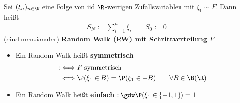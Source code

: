 \begin{defi}\enter %
Sei $(\xi_n)_{n\in\N}$ eine Folge von iid $\R$-wertigen Zufallsvariablen mit $\xi_1\sim F$. Dann heißt
\begin{align*}
S_N:=\sum\limits_{i=1}^n\xi_i\qquad S_0:=0
\end{align*}
(eindimensionaler) \textbf{Random Walk (RW) mit Schrittverteilung} $F$.
\begin{itemize}
\item Ein Random Walk heißt \textbf{symmetrisch}
\begin{align*}
:&\Longleftrightarrow F\text{ symmetrisch}\\
&\Longleftrightarrow\P(\xi_1\in B)=\P(\xi_1\in -B)\qquad\forall B\in\B(\R)
\end{align*}
\item Ein Random Walk heißt \textbf{einfach} 
$\begin{aligned}
	:\gdw\P(\xi_1\in\lbrace-1,1\rbrace)=1
\end{aligned}$
\end{itemize}
\end{defi}

